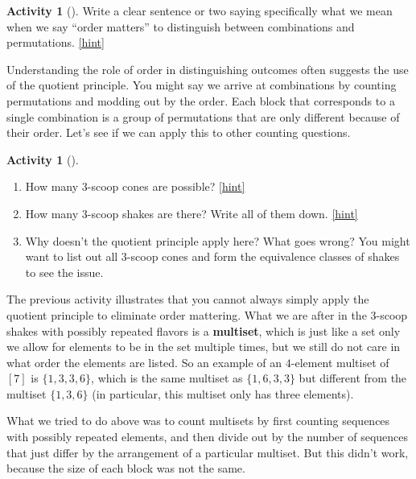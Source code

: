 \documentclass[10pt,]{book}
\newcommand{\terminology}[1]{\textbf{#1}}
\theoremstyle{plain}
\theoremstyle{definition}
\theoremstyle{definition}
\theoremstyle{definition}
\newtheorem{activity}[project]{Activity}
\numberwithin{equation}{chapter}
\begin{document}
\begin{activity}[]\label{activity-111}
\hypertarget{p-798}{}%
Write a clear sentence or two saying specifically what we mean when we say ``order matters'' to distinguish between combinations and permutations.%
\hfill{\tiny\hyperlink{a-118}{[hint]}\hypertarget{q-118}{}}\end{activity}
\hypertarget{p-800}{}%
Understanding the role of order in distinguishing outcomes often suggests the use of the quotient principle.  You might say we arrive at combinations by counting permutations and modding out by the order.  Each block that corresponds to a single combination is a group of permutations that are only different because of their order.  Let's see if we can apply this to other counting questions.%
\begin{activity}[]\label{activity-112}
\begin{enumerate}[font=\bfseries,label=(\alph*),ref=\alph*]
\item\label{task-150} \hypertarget{p-801}{}%
How many 3-scoop cones are possible?%
\hfill{\tiny\hyperlink{a-119.a}{[hint]}\hypertarget{q-119.a}{}}\item\label{task-151} \hypertarget{p-803}{}%
How many 3-scoop shakes are there?  Write all of them down.%
\hfill{\tiny\hyperlink{a-119.b}{[hint]}\hypertarget{q-119.b}{}}\item\label{task-152} \hypertarget{p-805}{}%
Why doesn't the quotient principle apply here?  What goes wrong?  You might want to list out all 3-scoop cones and form the equivalence classes of shakes to see the issue.%
\end{enumerate}
\end{activity}
\hypertarget{p-806}{}%
The previous activity illustrates that you cannot always simply apply the quotient principle to eliminate order mattering.  What we are after in the 3-scoop shakes with possibly repeated flavors is a \terminology{multiset}, which is just like a set only we allow for elements to be in the set multiple times, but we still do not care in what order the elements are listed.  So an example of an \(4\)-element multiset of \([7]\) is \(\{1,3,3,6\}\), which is the same multiset as \(\{1,6,3,3\}\) but different from the multiset \(\{1,3,6\}\) (in particular, this multiset only has three elements).%
\par
\hypertarget{p-807}{}%
What we tried to do above was to count multisets by first counting sequences with possibly repeated elements, and then divide out by the number of sequences that just differ by the arrangement of a particular multiset.  But this didn't work, because the size of each block was not the same.%
\end{document}
